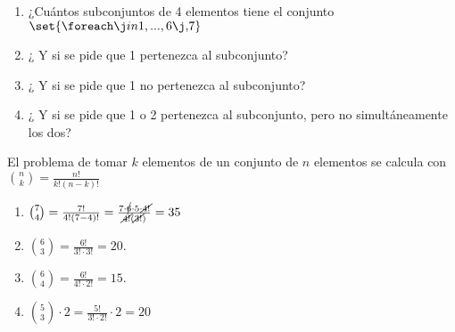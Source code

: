 \begin{enunciado}{\ejercicio}

  \begin{enumerate}[label=\roman*)]
    \item ¿Cuántos subconjuntos de 4 elementos tiene el conjunto
          $\set{\foreach \j in {1,...,6}{ \j, }7} $
    \item ¿ Y si se pide que 1 pertenezca al subconjunto?
    \item ¿ Y si se pide que 1 no pertenezca al subconjunto?
    \item ¿ Y si se pide que 1 o 2 pertenezca al subconjunto, pero no simultáneamente los dos?
  \end{enumerate}

\end{enunciado}

El problema de tomar $k$ elementos de un conjunto de $n$ elementos se calcula con
$\binom{n}{k} = \frac{n!}{k!(n-k)!}$

\begin{enumerate}[label=\roman*)]
  \item  $\binom{7}{4} =
          \frac{7!}{4!(7-4)!} =
          \frac{7\cdot \cancel{6} \cdot 5 \cdot \cancel{4!}}{\cancel{4!}(\cancel{3!})} = 35$

  \item $\binom{6}{3} = \frac{6!}{3!\cdot 3!} = 20$.

  \item $\binom{6}{4} = \frac{6!}{4!\cdot 2!} = 15$.

  \item $\binom{5}{3} \cdot 2 = \frac{5!}{3!\cdot 2!} \cdot 2 = 20$
\end{enumerate}
